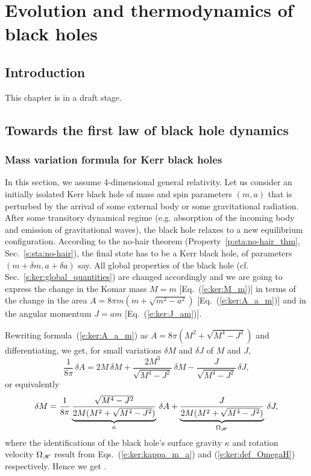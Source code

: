 \chapter{Evolution and thermodynamics of black holes}
\label{s:evo}

\minitoc

\section{Introduction}

This chapter is in a draft stage.

\section{Towards the first law of black hole dynamics} \label{s:evo:towards_1st_law}

\subsection{Mass variation formula for Kerr black holes} \label{s:evo:mass_variation_Kerr}

In this section, we assume 4-dimensional general relativity.
Let us consider an initially isolated Kerr black hole of mass and spin parameters $(m,a)$
that is perturbed by the arrival of some external body or some gravitational
radiation. After some transitory dynamical regime (e.g. absorption of the
incoming body and emission of gravitational waves), the black hole relaxes
to a new equilibrium configuration. According to the
no-hair theorem (Property~\ref{p:sta:no-hair_thm}, Sec.~\ref{s:sta:no-hair}),
the final state has to be a Kerr black hole, of
parameters $(m+\delta m, a+\delta a)$ say. All global properties of the black
hole (cf. Sec.~\ref{s:ker:global_quantities})
are changed accordingly and we are going to express the change in
the Komar mass $M = m$ [Eq.~(\ref{e:ker:M_m})] in terms of the change in
the area $A = 8 \pi m (m + \sqrt{m^2-a^2})$ [Eq.~(\ref{e:ker:A_a_m})]
and in the angular momentum $J = a m$ [Eq.~(\ref{e:ker:J_am})].

Rewriting formula~(\ref{e:ker:A_a_m}) as $A = 8 \pi (M^2 + \sqrt{M^4 - J^2})$
and differentiating, we get, for small variations $\delta M$ and $\delta J$
of $M$ and $J$,
\[
\frac{1}{8\pi} \, \delta A =  2 M\,  \delta M + \frac{2M^3}{\sqrt{M^4-J^2}}\, \delta M
    - \frac{J}{\sqrt{M^4-J^2}}\, \delta J ,
\]
or equivalently
\[
    \delta M = \frac{1}{8\pi}
\underbrace{\frac{\sqrt{M^4-J^2}}{2M(M^2+\sqrt{M^4-J^2})}}_{\kappa} \, \delta A
+ \underbrace{\frac{J}{2M(M^2+\sqrt{M^4-J^2})}}_{\Omega_{\mathscr{H}}} \, \delta J  ,
\]
where the identifications of the black hole's surface gravity $\kappa$ and
rotation velocity $\Omega_{\mathscr{H}}$ result from Eqs.~(\ref{e:ker:kappa_m_a})
and (\ref{e:ker:def_OmegaH}) respectively. Hence we get
\be \label{e:evo:mass_variation_Kerr}
     .
\ee

